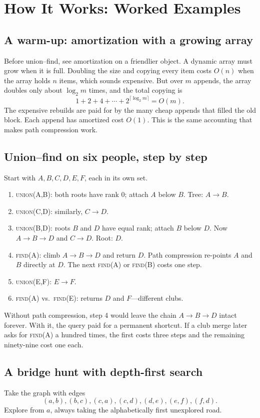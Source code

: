 \section{How It Works: Worked Examples}
\subsection{A warm-up: amortization with a growing array}
Before union--find, see amortization on a friendlier object. A dynamic array must grow when it is full. Doubling the size and copying every item costs $O(n)$ when the array holds $n$ items, which sounds expensive. But over $m$ appends, the array doubles only about $\log_2 m$ times, and the total copying is
\[
1+2+4+\cdots+2^{\lceil\log_2 m\rceil}=O(m).
\]
The expensive rebuilds are paid for by the many cheap appends that filled the old block. Each append has amortized cost $O(1)$. This is the same accounting that makes path compression work.

\subsection{Union--find on six people, step by step}
Start with $A,B,C,D,E,F$, each in its own set.

\begin{enumerate}
\item \textsc{union}(A,B): both roots have rank $0$; attach $A$ below $B$. Tree: $A\to B$.
\item \textsc{union}(C,D): similarly, $C\to D$.
\item \textsc{union}(B,D): roots $B$ and $D$ have equal rank; attach $B$ below $D$. Now $A\to B\to D$ and $C\to D$. Root: $D$.
\item \textsc{find}(A): climb $A\to B\to D$ and return $D$. Path compression re-points $A$ and $B$ directly at $D$. The next \textsc{find}(A) or \textsc{find}(B) costs one step.
\item \textsc{union}(E,F): $E\to F$.
\item \textsc{find}(A) vs.\ \textsc{find}(E): returns $D$ and $F$---different clubs.
\end{enumerate}

Without path compression, step 4 would leave the chain $A\to B\to D$ intact forever. With it, the query paid for a permanent shortcut. If a club merge later asks for \textsc{find}(A) a hundred times, the first costs three steps and the remaining ninety-nine cost one each.

\subsection{A bridge hunt with depth-first search}
Take the graph with edges
\[
(a,b),(b,c),(c,a),(c,d),(d,e),(e,f),(f,d).
\]
Explore from $a$, always taking the alphabetically first unexplored road.

